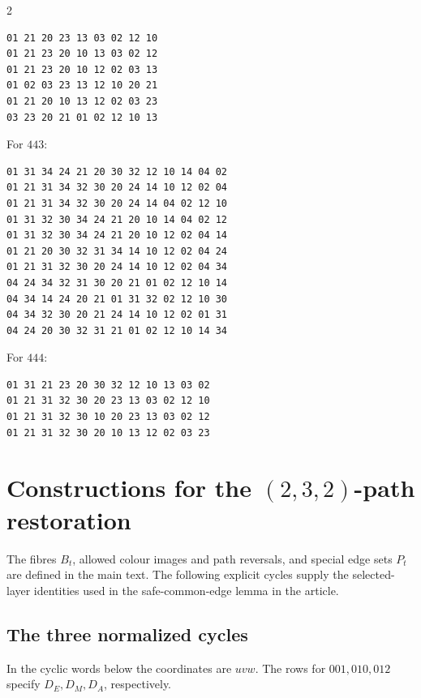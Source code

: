 \begin{multicols}{2}
\begin{minipage}{\linewidth}
\begin{verbatim}
01 21 20 23 13 03 02 12 10
01 21 23 20 10 13 03 02 12
01 21 23 20 10 12 02 03 13
01 02 03 23 13 12 10 20 21
01 21 20 10 13 12 02 03 23
03 23 20 21 01 02 12 10 13
\end{verbatim}
\end{minipage}\par\medskip
\noindent\begin{minipage}{\linewidth}
\noindent For $443$:
\begin{verbatim}
01 31 34 24 21 20 30 32 12 10 14 04 02
01 21 31 34 32 30 20 24 14 10 12 02 04
01 21 31 34 32 30 20 24 14 04 02 12 10
01 31 32 30 34 24 21 20 10 14 04 02 12
01 31 32 30 34 24 21 20 10 12 02 04 14
01 21 20 30 32 31 34 14 10 12 02 04 24
01 21 31 32 30 20 24 14 10 12 02 04 34
04 24 34 32 31 30 20 21 01 02 12 10 14
04 34 14 24 20 21 01 31 32 02 12 10 30
04 34 32 30 20 21 24 14 10 12 02 01 31
04 24 20 30 32 31 21 01 02 12 10 14 34
\end{verbatim}
\end{minipage}\par\medskip
\noindent\begin{minipage}{\linewidth}
\noindent For $444$:
\begin{verbatim}
01 31 21 23 20 30 32 12 10 13 03 02
01 21 31 32 30 20 23 13 03 02 12 10
01 21 31 32 30 10 20 23 13 03 02 12
01 21 31 32 30 20 10 13 12 02 03 23
\end{verbatim}
\end{minipage}\par\medskip

\end{multicols}

\section{Constructions for the \texorpdfstring{$(2,3,2)$}{(2,3,2)}-path restoration}
\label{app:path232-constructions}
The fibres $B_t$, allowed colour images and path reversals, and special
edge sets $P_t$ are defined in the main text. The following explicit
cycles supply the selected-layer identities used in
the safe-common-edge lemma in the article.

\subsection{The three normalized cycles}
In the cyclic words below the coordinates are $uvw$. The rows for
$001,010,012$ specify $D_E,D_M,D_A$, respectively.

